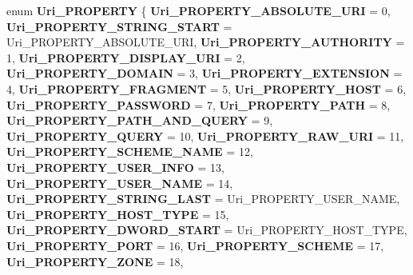 \begin{DoxyCompactItemize}
\item 
\mbox{\label{interface_i_uri_a8ff540739d5cf239f7486bbd8a629f1e}} 
enum {\bfseries Uri\+\_\+\+P\+R\+O\+P\+E\+R\+TY} \{ \newline
{\bfseries Uri\+\_\+\+P\+R\+O\+P\+E\+R\+T\+Y\+\_\+\+A\+B\+S\+O\+L\+U\+T\+E\+\_\+\+U\+RI} = 0, 
{\bfseries Uri\+\_\+\+P\+R\+O\+P\+E\+R\+T\+Y\+\_\+\+S\+T\+R\+I\+N\+G\+\_\+\+S\+T\+A\+RT} = Uri\+\_\+\+P\+R\+O\+P\+E\+R\+T\+Y\+\_\+\+A\+B\+S\+O\+L\+U\+T\+E\+\_\+\+U\+RI, 
{\bfseries Uri\+\_\+\+P\+R\+O\+P\+E\+R\+T\+Y\+\_\+\+A\+U\+T\+H\+O\+R\+I\+TY} = 1, 
{\bfseries Uri\+\_\+\+P\+R\+O\+P\+E\+R\+T\+Y\+\_\+\+D\+I\+S\+P\+L\+A\+Y\+\_\+\+U\+RI} = 2, 
\newline
{\bfseries Uri\+\_\+\+P\+R\+O\+P\+E\+R\+T\+Y\+\_\+\+D\+O\+M\+A\+IN} = 3, 
{\bfseries Uri\+\_\+\+P\+R\+O\+P\+E\+R\+T\+Y\+\_\+\+E\+X\+T\+E\+N\+S\+I\+ON} = 4, 
{\bfseries Uri\+\_\+\+P\+R\+O\+P\+E\+R\+T\+Y\+\_\+\+F\+R\+A\+G\+M\+E\+NT} = 5, 
{\bfseries Uri\+\_\+\+P\+R\+O\+P\+E\+R\+T\+Y\+\_\+\+H\+O\+ST} = 6, 
\newline
{\bfseries Uri\+\_\+\+P\+R\+O\+P\+E\+R\+T\+Y\+\_\+\+P\+A\+S\+S\+W\+O\+RD} = 7, 
{\bfseries Uri\+\_\+\+P\+R\+O\+P\+E\+R\+T\+Y\+\_\+\+P\+A\+TH} = 8, 
{\bfseries Uri\+\_\+\+P\+R\+O\+P\+E\+R\+T\+Y\+\_\+\+P\+A\+T\+H\+\_\+\+A\+N\+D\+\_\+\+Q\+U\+E\+RY} = 9, 
{\bfseries Uri\+\_\+\+P\+R\+O\+P\+E\+R\+T\+Y\+\_\+\+Q\+U\+E\+RY} = 10, 
\newline
{\bfseries Uri\+\_\+\+P\+R\+O\+P\+E\+R\+T\+Y\+\_\+\+R\+A\+W\+\_\+\+U\+RI} = 11, 
{\bfseries Uri\+\_\+\+P\+R\+O\+P\+E\+R\+T\+Y\+\_\+\+S\+C\+H\+E\+M\+E\+\_\+\+N\+A\+ME} = 12, 
{\bfseries Uri\+\_\+\+P\+R\+O\+P\+E\+R\+T\+Y\+\_\+\+U\+S\+E\+R\+\_\+\+I\+N\+FO} = 13, 
{\bfseries Uri\+\_\+\+P\+R\+O\+P\+E\+R\+T\+Y\+\_\+\+U\+S\+E\+R\+\_\+\+N\+A\+ME} = 14, 
\newline
{\bfseries Uri\+\_\+\+P\+R\+O\+P\+E\+R\+T\+Y\+\_\+\+S\+T\+R\+I\+N\+G\+\_\+\+L\+A\+ST} = Uri\+\_\+\+P\+R\+O\+P\+E\+R\+T\+Y\+\_\+\+U\+S\+E\+R\+\_\+\+N\+A\+ME, 
{\bfseries Uri\+\_\+\+P\+R\+O\+P\+E\+R\+T\+Y\+\_\+\+H\+O\+S\+T\+\_\+\+T\+Y\+PE} = 15, 
{\bfseries Uri\+\_\+\+P\+R\+O\+P\+E\+R\+T\+Y\+\_\+\+D\+W\+O\+R\+D\+\_\+\+S\+T\+A\+RT} = Uri\+\_\+\+P\+R\+O\+P\+E\+R\+T\+Y\+\_\+\+H\+O\+S\+T\+\_\+\+T\+Y\+PE, 
{\bfseries Uri\+\_\+\+P\+R\+O\+P\+E\+R\+T\+Y\+\_\+\+P\+O\+RT} = 16, 
\newline
{\bfseries Uri\+\_\+\+P\+R\+O\+P\+E\+R\+T\+Y\+\_\+\+S\+C\+H\+E\+ME} = 17, 
{\bfseries Uri\+\_\+\+P\+R\+O\+P\+E\+R\+T\+Y\+\_\+\+Z\+O\+NE} = 18, 

\end{DoxyCompactItemize}
